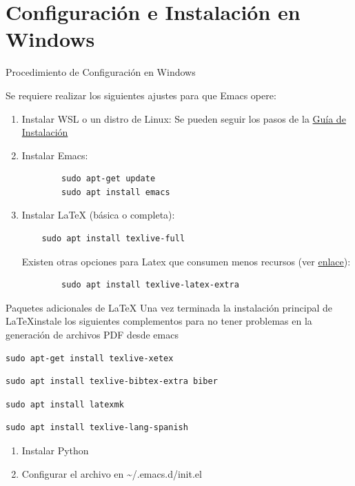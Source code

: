 \documentclass[presentation]{beamer}
\begin{document}
\section{Configuración e Instalación en Windows}
\label{sec:org1215567}
\begin{frame}{Procedimiento de Configuración en Windows}
 \label{org3f7c0a5}

Se requiere realizar los siguientes ajustes para que Emacs opere:

\begin{enumerate}
\item Instalar WSL o un distro de Linux: Se pueden seguir los pasos de la
\href{https://learn.microsoft.com/es-es/windows/wsl/install}{Guía de Instalación}
\item Instalar Emacs:
\begin{verbatim}
        sudo apt-get update
        sudo apt install emacs
\end{verbatim}
\item Instalar \LaTeX{} (básica o completa):
\begin{verbatim}
	sudo apt install texlive-full
\end{verbatim}
Existen otras opciones para Latex que consumen menos recursos (ver
\href{https://linuxconfig.org/how-to-install-latex-on-ubuntu-20-04-focal-fossa-linux}{enlace}):
\begin{verbatim}
        sudo apt install texlive-latex-extra
\end{verbatim}
\end{enumerate}
\end{frame}
\begin{frame}[label={sec:org98938e2},fragile]{Paquetes adicionales de \LaTeX}
 Una vez terminada la instalación principal de \LaTeX instale los
siguientes complementos para no tener problemas en la generación de
archivos PDF desde emacs
\begin{verbatim}
sudo apt-get install texlive-xetex
\end{verbatim}

\begin{verbatim}
sudo apt install texlive-bibtex-extra biber
\end{verbatim}

\begin{verbatim}
sudo apt install latexmk
\end{verbatim}

\begin{verbatim}
sudo apt install texlive-lang-spanish
\end{verbatim}
\begin{enumerate}
\item Instalar Python
\item Configurar el archivo en \textasciitilde{}/.emacs.d/init.el
\end{enumerate}
\end{frame}
\end{document}
